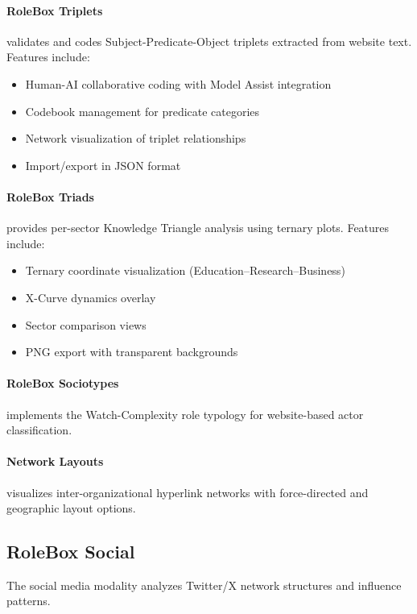 \paragraph{RoleBox Triplets} validates and codes Subject-Predicate-Object triplets extracted from website text. Features include:
\begin{itemize}
    \item Human-AI collaborative coding with Model Assist integration
    \item Codebook management for predicate categories
    \item Network visualization of triplet relationships
    \item Import/export in JSON format
\end{itemize}

\paragraph{RoleBox Triads} provides per-sector Knowledge Triangle analysis using ternary plots. Features include:
\begin{itemize}
    \item Ternary coordinate visualization (Education--Research--Business)
    \item X-Curve dynamics overlay
    \item Sector comparison views
    \item PNG export with transparent backgrounds
\end{itemize}

\paragraph{RoleBox Sociotypes} implements the Watch-Complexity role typology for website-based actor classification.

\paragraph{Network Layouts} visualizes inter-organizational hyperlink networks with force-directed and geographic layout options.

\subsection{RoleBox Social}

The social media modality analyzes Twitter/X network structures and influence patterns.

